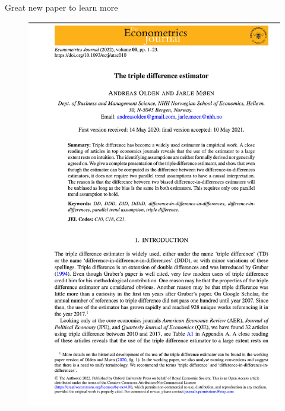 \documentclass{beamer}
\begin{document}
\begin{frame}{Great new paper to learn more}

\begin{figure}
\includegraphics[scale=0.25]{./lecture_includes/olden_moen_2022_ddd.png}
\end{figure}

\end{frame}
\end{document}
